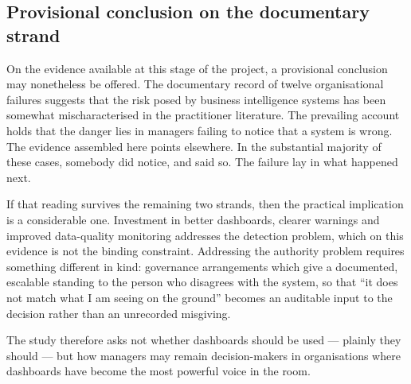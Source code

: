 \documentclass[11pt,a4paper]{article}
\numberwithin{figure}{section}
\numberwithin{table}{section}
\begin{document}
\subsection{Provisional conclusion on the documentary strand}

On the evidence available at this stage of the project, a provisional conclusion may nonetheless be
offered. The documentary record of twelve organisational failures suggests that the risk posed by
business intelligence systems has been somewhat mischaracterised in the practitioner literature.
The prevailing account holds that the danger lies in managers failing to notice that a system is
wrong. The evidence assembled here points elsewhere. In the substantial majority of these cases,
somebody did notice, and said so. The failure lay in what happened next.

If that reading survives the remaining two strands, then the practical implication is a
considerable one. Investment in better dashboards, clearer warnings and improved data-quality
monitoring addresses the detection problem, which on this evidence is not the binding constraint.
Addressing the authority problem requires something different in kind: governance arrangements
which give a documented, escalable standing to the person who disagrees with the system, so that
``it does not match what I am seeing on the ground'' becomes an auditable input to the decision
rather than an unrecorded misgiving.

The study therefore asks not whether dashboards should be used --- plainly they should --- but how
managers may remain decision-makers in organisations where dashboards have become the most powerful
voice in the room.

\newpage
\end{document}
